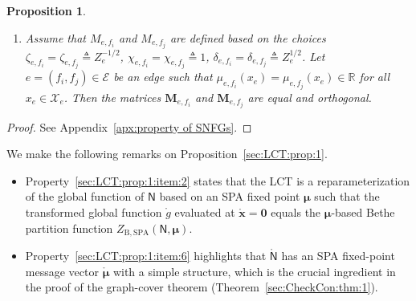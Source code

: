 \documentclass[journal]{IEEEtran}
\newcommand{\add}[1]{{\color{black}#1}}
\newtheorem{proposition}[theorem]{Proposition}
\newcommand{\vect}[1]{ \bm{#1} }
\newcommand{\set}[1]{\mathcal{#1}}
\newcommand{\sR}{\mathbb{R}}
\newcommand{\xe}{ x_{e} }
\newcommand{\vmu}{ \vect{ \mu } }
\newcommand{\graphN}{ \mathsf{N} }
\newcommand{\setE}{ \mathcal{E} }
\newcommand{\defeq}{ \triangleq }
\newcommand{\ZBSPA}{ Z_{\mathrm{B,SPA}} }
\newcommand{\matr}[1]{\vect{#1}}
\newcommand{\LCTv}[1]{ \mathring{ \vect{#1} } }
\newcommand{\LCT}[1]{ \mathring{#1} }
\newcommand{\efi}{ e,f_i }
\newcommand{\efj}{ e,f_j }
\begin{document}
\begin{proposition}
\begin{enumerate}
\begin{enumerate}
            \item\label{sec:LCT:prop:1:item:7:b} Assume that $M_{\efi}$ and $M_{\efj}$ are defined based on the
                  choices $\zeta_{\efi} = \zeta_{\efj} \defeq Z_e^{-1/2}$,
                  $\chi_{\efi} = \chi_{\efj} \defeq 1$,
                  $\delta_{\efi} = \delta_{\efj} \defeq Z_e^{1/2}$. Let
                  $e = (f_{i},f_{j}) \in \setE$ be an edge such that
                  $\mu_{\efi}(\xe) = \mu_{\efj}(\xe) \in \sR$ for all $x_e \in \set{X}_e$. Then
                  the matrices $\matr{M}_{\efi}$
                  and $\matr{M}_{\efj}$ are equal
                  and orthogonal.

          \end{enumerate}

  \end{enumerate}
\end{proposition}

\begin{proof}
  See Appendix~\ref{apx:property of SNFGs}.
\end{proof}

\add{We make the following remarks on} Proposition~\ref{sec:LCT:prop:1}.
\begin{itemize}

  \item Property~\ref{sec:LCT:prop:1:item:2} states that the LCT is a \add{reparameterization} of the global function of $\graphN$ based on an SPA fixed point $ \vmu $ such that
        the \add{transformed} global function $\LCT{g}$ evaluated at $ \LCTv{x} = \vect{0} $ equals the \add{$\vmu$-based Bethe partition function $\ZBSPA(\graphN,\vmu)$}.

  \item Property~\ref{sec:LCT:prop:1:item:6} highlights that  $\LCT{\graphN}$ has an SPA fixed-point message vector $ \LCT{\vmu} $ with a simple structure,
        \add{which is the crucial ingredient in the proof of the graph-cover theorem (Theorem~\ref{sec:CheckCon:thm:1}).}

\end{itemize}
\end{document}
